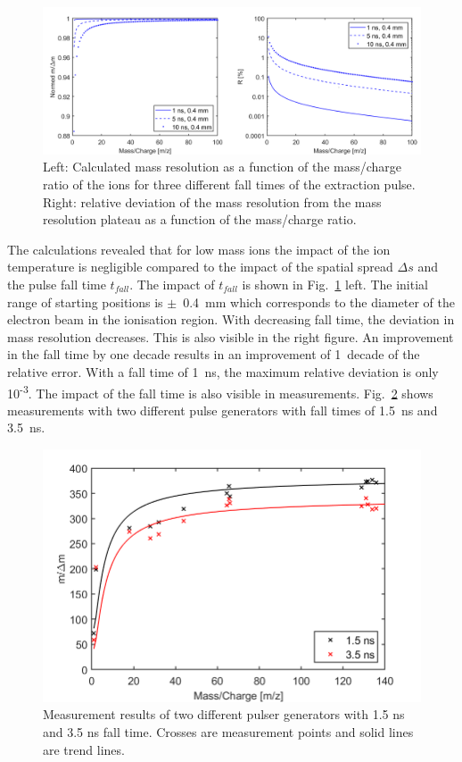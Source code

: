 	\begin{figure}[h!] %
		\centering
		\includegraphics[width=\textwidth]{Bilder/PulseSimMassRes_Norm.png}
		\caption{Left: Calculated mass resolution as a function of the mass/charge ratio of the ions for three different fall times of the extraction pulse. Right: relative deviation of the mass resolution from the mass resolution plateau as a function of the mass/charge ratio.}
		\label{fig:Simtfall}
	\end{figure}
	The calculations revealed that for low mass ions the impact of the ion temperature is negligible compared to the impact of the spatial spread $\Delta s$ and the pulse fall time $t_{fall}$. The impact of $t_{fall}$ is shown in Fig.~\ref{fig:Simtfall} left. The initial range of starting positions is $\pm$~0.4~mm which corresponds to the diameter of the electron beam in the ionisation region. With decreasing fall time, the deviation in mass resolution decreases. This is also visible in the right figure. An improvement in the fall time by one decade results in an improvement of 1~decade of the relative error. With a fall time of 1~ns, the maximum relative deviation is only 10\textsuperscript{-3}. The impact of the fall time is also visible in measurements. Fig.~\ref{fig:LabWLE} shows measurements with two different pulse generators with fall times of 1.5~ns and 3.5~ns.
	\begin{figure}[h!] %
		\centering
		\includegraphics[width=.8\textwidth]{Bilder/PulseLabWLEm480.png}
		\caption{Measurement results of two different pulser generators with 1.5 ns and 3.5 ns fall time. Crosses are measurement points and solid lines are trend lines.}
		\label{fig:LabWLE}
	\end{figure}
